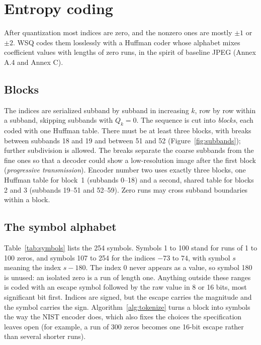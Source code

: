 \section{Entropy coding}
\label{sec:entropy}

After quantization most indices are zero, and the nonzero ones are mostly $\pm1$ or $\pm2$.
WSQ codes them losslessly with a Huffman coder whose alphabet mixes coefficient values with
lengths of zero runs, in the spirit of baseline JPEG (Annex A.4 and Annex C).

\subsection{Blocks}
\label{sec:blocks}

The indices are serialized subband by subband in increasing $k$, row by row within a subband,
skipping subbands with $Q_k = 0$. The sequence is cut into \emph{blocks}, each coded with one
Huffman table. There must be at least three blocks, with breaks between subbands 18 and 19 and
between 51 and 52 (Figure~\ref{fig:subbands}); further subdivision is allowed. The breaks
separate the coarse subbands from the fine ones so that a decoder could show a low-resolution
image after the first block (\emph{progressive transmission}). Encoder number two uses exactly
three blocks, one Huffman table for block~1 (subbands 0--18) and a second, shared table for
blocks 2 and 3 (subbands 19--51 and 52--59). Zero runs may cross subband boundaries within a
block.

\subsection{The symbol alphabet}

Table~\ref{tab:symbols} lists the 254 symbols. Symbols 1 to 100 stand for runs of 1 to 100
zeros, and symbols 107 to 254 for the indices $-73$ to $74$, with symbol $s$ meaning the index
$s - 180$. The index 0 never appears as a value, so symbol 180 is unused: an isolated zero is a
run of length one. Anything outside these ranges is coded with an escape symbol followed by the
raw value in 8 or 16 bits, most significant bit first. Indices are signed, but the escape
carries the magnitude and the symbol carries the sign. Algorithm~\ref{alg:tokenize} turns a
block into symbols the way the NIST encoder does, which also fixes the choices the
specification leaves open (for example, a run of 300 zeros becomes one 16-bit escape rather
than several shorter runs).

